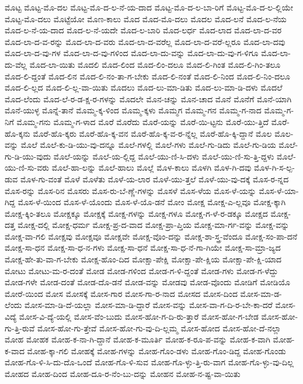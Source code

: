 {ಮೊಟ್ಟ
ಮೊಟ್ಟ-ಮೊ-ದಲ
ಮೊಟ್ಟ-ಮೊ-ದ-ಲ-ನೆ-ಯ-ದಾದ
ಮೊಟ್ಟ-ಮೊ-ದ-ಲ-ಬಾ-ರಿಗೆ
ಮೊಟ್ಟ-ಮೊ-ದ-ಲ-ಲ್ಲಿಯೇ
ಮೊಟ್ಟ-ಮೊ-ದಲು
ಮೊಟ್ಟೆಯೋ
ಮೊಣ-ಕಾಲು
ಮೊದ
ಮೊದ-ಮೊ-ದಲು
ಮೊದಲ
ಮೊದ-ಲನೆ
ಮೊದ-ಲ-ನೆಯ
ಮೊದ-ಲ-ನೆ-ಯ-ದಾದ
ಮೊದ-ಲ-ನೆ-ಯದೇ
ಮೊದ-ಲ-ಬಾರಿ
ಮೊದ-ಲರ್ಧ
ಮೊದ-ಲಾದ
ಮೊದ-ಲಾ-ದ-ವರ
ಮೊದ-ಲಾ-ದ-ವ-ರನ್ನು
ಮೊದ-ಲಾ-ದ-ವರು
ಮೊದ-ಲಾ-ದ-ವರೆಲ್ಲ
ಮೊದ-ಲಾ-ದ-ವರೆ-ಲ್ಲರೂ
ಮೊದ-ಲಾ-ದವು
ಮೊದ-ಲಾ-ದ-ವು-ಗಳ
ಮೊದ-ಲಾ-ದ-ವು-ಗಳಿಂದ
ಮೊದ-ಲಾ-ದು-ವನ್ನು
ಮೊದ-ಲಾ-ದು-ವು-ಗ-ಳಿಗೂ
ಮೊದ-ಲಾ-ದು-ವೆಲ್ಲ
ಮೊದ-ಲಾ-ಯಿತು
ಮೊದಲಿ
ಮೊದ-ಲಿಂದ
ಮೊದ-ಲಿಂ-ದಲೂ
ಮೊದ-ಲಿ-ಗಿಂತ
ಮೊದ-ಲಿ-ಗಿಂ-ತಲೂ
ಮೊದ-ಲಿ-ದ್ದಂತೆ
ಮೊದ-ಲಿನ
ಮೊದ-ಲಿ-ನಂ-ತಾ-ಗ-ಬೇಕು
ಮೊದ-ಲಿ-ನಂತೆ
ಮೊದ-ಲಿ-ನಿಂದ
ಮೊದ-ಲಿ-ನಿಂ-ದಲೂ
ಮೊದ-ಲಿ-ಲ್ಲದ
ಮೊದ-ಲಿ-ಲ್ಲ-ವಾ-ಯಿತು
ಮೊದಲು
ಮೊದ-ಲು-ಮಾ-ಡಿತು
ಮೊದ-ಲು-ಮಾ-ಡಿ-ದಳು
ಮೊದಲೆ
ಮೊದ-ಲೆಂದು
ಮೊದ-ಲೆ-ರ-ಡ-ಕ್ಷ-ರ-ಗಳನ್ನು
ಮೊದಲೇ
ಮೊನ-ಚನ್ನು
ಮೊನ-ಚಾದ
ಮೊನೆ
ಮೊನೆಗೆ
ಮೊನೆ-ಯಾಗಿ
ಮೊನೆ-ಯುಳ್ಳ
ಮೊನ್ನೆ-ತಾನೆ
ಮೊಮ್ಮ-ಕ್ಕ-ಳಿಂದ
ಮೊಮ್ಮ-ಕ್ಕಳು
ಮೊಮ್ಮಗ
ಮೊಮ್ಮ-ಗನ
ಮೊಮ್ಮ-ಗ-ನಾದ
ಮೊಮ್ಮ-ಗ-ನಿಗೆ
ಮೊಮ್ಮ-ಗನು
ಮೊಮ್ಮ-ಗ-ಳಾದ
ಮೊರೆ
ಮೊರೆದು
ಮೊರೆ-ಯನ್ನು
ಮೊರೆ-ಯಿ-ಟ್ಟನು
ಮೊರೆ-ಯು-ತ್ತಿದೆ
ಮೊರೆ-ಹೊ-ಕ್ಕನು
ಮೊರೆ-ಹೊ-ಕ್ಕರು
ಮೊರೆ-ಹೊ-ಕ್ಕ-ವನ
ಮೊರೆ-ಹೊ-ಕ್ಕ-ವ-ರ-ನ್ನೆಲ್ಲ
ಮೊರೆ-ಹೊ-ಕ್ಕಿ-ದ್ದಾನೆ
ಮೊಲ
ಮೊಲ-ವನ್ನು
ಮೊಲೆ
ಮೊಲೆ-ಕು-ಡಿ-ಯು-ವು-ದನ್ನೂ
ಮೊಲೆ-ಗಳಲ್ಲಿ
ಮೊಲೆ-ಗಳು
ಮೊಲೆ-ಗು-ಡಿದು
ಮೊಲೆ-ಗು-ಡಿಯ
ಮೊಲೆ-ಗು-ಡಿ-ಯು-ವುದು
ಮೊಲೆ-ಯನ್ನು
ಮೊಲೆ-ಯ-ಲ್ಲಿದ್ದ
ಮೊಲೆ-ಯು-ಣಿ-ಸಿ-ದಳು
ಮೊಲೆ-ಯು-ಣಿ-ಸು-ತ್ತಿ-ದ್ದಳು
ಮೊಲೆ-ಯು-ಣಿ-ಸು-ವರು
ಮೊಲೆ-ಹಾ-ಲನ್ನು
ಮೊಲೆ-ಹಾಲು
ಮೊಲ್ಲೆ
ಮೊಳ-ಕಾಲು
ಮೊಳಗಿ
ಮೊಳ-ಗಿ-ದವು
ಮೊಳ-ಗಿ-ಸ-ಲ್ಪ-ಡುವ
ಮೊಳ-ಗು-ವಂತೆ
ಮೊಳೆ
ಮೊಳೆತು
ಮೊಳೆ-ಯ-ಲಾರ
ಮೊಳೆ-ಯು-ತ್ತಲೆ
ಮೊಳೆ-ಯು-ವು-ದಕ್ಕೆ
ಮೊಸ-ರ-ನ್ನದ
ಮೊಸ-ರನ್ನು
ಮೊಸ-ರಿನ
ಮೊಸರು
ಮೊಸ-ರು-ಬೆ-ಣ್ಣೆ-ಗಳನ್ನು
ಮೊಸಳೆ
ಮೊಸ-ಳೆಯ
ಮೊಸ-ಳೆ-ಯನ್ನು
ಮೊಸ-ಳೆ-ಯಾ-ಗಿದ್ದ
ಮೊಸ-ಳೆ-ಯಿಂದ
ಮೊಸ-ಳೆ-ಯೊಂದು
ಮೊಸ-ಳೆ-ಯೊ-ಡನೆ
ಮೋಂ
ಮೋಕ್ಷ
ಮೋಕ್ಷ-ಎ-ಲ್ಲವೂ
ಮೋಕ್ಷ-ಕ್ಕಾಗಿ
ಮೋಕ್ಷ-ಕ್ಕಿಂ-ತಲೂ
ಮೋಕ್ಷಕ್ಕೂ
ಮೋಕ್ಷಕ್ಕೆ
ಮೋಕ್ಷ-ಗಳನ್ನು
ಮೋಕ್ಷ-ಗಳೂ
ಮೋಕ್ಷ-ಗ-ಳೆ-ರ-ಡಕ್ಕೂ
ಮೋಕ್ಷದ
ಮೋಕ್ಷ-ದತ್ತ
ಮೋಕ್ಷ-ದಲ್ಲಿ
ಮೋಕ್ಷ-ಧರ್ಮ
ಮೋಕ್ಷ-ಪ್ರ-ದ-ವಾದ
ಮೋಕ್ಷ-ಪ್ರಾ-ಪ್ತಿಯ
ಮೋಕ್ಷ-ಮಾ-ರ್ಗ-ವನ್ನು
ಮೋಕ್ಷ-ವನ್ನು
ಮೋಕ್ಷ-ವಾ-ಗಲಿ
ಮೋಕ್ಷವು
ಮೋಕ್ಷವೂ
ಮೋಕ್ಷವೇ
ಮೋಕ್ಷ-ವೊಂ-ದನ್ನು
ಮೋಕ್ಷ-ಶಾ-ಸ್ತ್ರ-ವೆಂದೂ
ಮೋಕ್ಷ-ಸಂ-ಪಾ-ದನೆ
ಮೋಕ್ಷ-ಸಾ-ಧನ
ಮೋಕ್ಷ-ಸಾ-ಧ-ನ-ಗಳು
ಮೋಕ್ಷ-ಸಾ-ಧನೆ
ಮೋಕ್ಷ-ಸಾ-ಧ-ನೆ-ಗಾ-ಗಿಯೇ
ಮೋಕ್ಷ-ಸಾ-ಮ್ರಾ-ಜ್ಯದ
ಮೋಕ್ಷ-ಹೇ-ತು-ವಾ-ಗ-ಬೇಕು
ಮೋಕ್ಷ-ಹೊಂ-ದಿದ
ಮೋಕ್ಷಾ-ಪೇಕ್ಷಿ
ಮೋಕ್ಷಾ-ಪೇ-ಕ್ಷಿಯ
ಮೋಕ್ಷಾ-ಪೇ-ಕ್ಷಿ-ಯಾದ
ಮೋಟು
ಮೋಟು-ಮ-ರ-ದಂತೆ
ಮೋಡ
ಮೋಡ-ಗಳಿಂದ
ಮೋಡ-ಗ-ಳಿ-ದ್ದಂತೆ
ಮೋಡ-ಗಳು
ಮೋಡ-ಗ-ಳೆದ್ದು
ಮೋಡ-ಗಳೇ
ಮೋಡ-ದಂತೆ
ಮೋಡ-ದೊ-ಡನೆ
ಮೋಡ-ವನ್ನು
ಮೋಡವು
ಮೋಡ-ವೊಂದು
ಮೋಡಿಗೆ
ಮೋಡಿಯೊ
ಮೋರೆ-ಯಿಂದ
ಮೋಸ
ಮೋಸಕ್ಕೆ
ಮೋಸ-ಗಾರ
ಮೋಸ-ಗಾ-ರ-ನಾದ
ಮೋಸದ
ಮೋಸ-ದಿಂದ
ಮೋಸ-ಮಾ-ಡ-ಲೆಂದು
ಮೋಸ-ಮಾ-ಡಿ-ದೆ-ಯಲ್ಲಾ
ಮೋಸ-ಮಾ-ಡಿ-ದ್ದಾರೆ
ಮೋಸ-ವನ್ನು
ಮೋಸ-ವಾ-ಗ-ದಿ-ರ-ಬೇ-ಕಾ-ದರೆ
ಮೋಸ-ವಿದ್ಯೆ
ಮೋಸ-ವಿ-ದ್ಯೆ-ಯಲ್ಲಿ
ಮೋಸ-ವೆಂ-ಬುದು
ಮೋಸ-ಹೋ-ಗ-ದಿ-ರು-ತ್ತಾರೆ
ಮೋಸ-ಹೋ-ಗ-ಬೇಡ
ಮೋಸ-ಹೋ-ಗು-ತ್ತಿ-ರುವೆ
ಮೋಸ-ಹೋ-ಗು-ತ್ತೇವೆ
ಮೋಸ-ಹೋ-ಗು-ವು-ದಿ-ಲ್ಲಮ್ಮ
ಮೋಸ-ಹೋದ
ಮೋಸ-ಹೋ-ದೆ-ನಲ್ಲಾ
ಮೋಹ
ಮೋಹಕ
ಮೋಹ-ಕ-ನಾ-ಗಿ-ದ್ದಾನೆ
ಮೋಹ-ಕ-ಮೂರ್ತಿ
ಮೋಹ-ಕ-ರೂ-ಪ-ವನ್ನು
ಮೋಹ-ಕ-ವಾಗಿ
ಮೋಹ-ಕ-ವಾದ
ಮೋಹ-ಕ್ಕಾ-ಗಲಿ
ಮೋಹಕ್ಕೆ
ಮೋಹ-ಗಳನ್ನು
ಮೋಹ-ಗೊಂ-ಡಳು
ಮೋಹ-ಗೊಂ-ಡಿದ್ದ
ಮೋಹ-ಗೊಂಡು
ಮೋಹ-ಗೊ-ಳಿ-ಸಿ-ದು-ದೊ-ಒಂದೆ
ಮೋಹ-ಗೊ-ಳಿ-ಸುವ
ಮೋಹ-ಗೊ-ಳ್ಳು-ತ್ತಿ-ರು-ವಾಗ
ಮೋಹ-ಗೊ-ಳ್ಳು-ವು-ದಿಲ್ಲ
ಮೋಹದ
ಮೋಹ-ದಿಂದ
ಮೋಹ-ದೂ-ರ-ನೆಂ-ಬು-ದನ್ನು
ಮೋಹನ
ಮೋಹ-ನ-ಷ್ಟ-ವಾ-ಯಿತು
}
